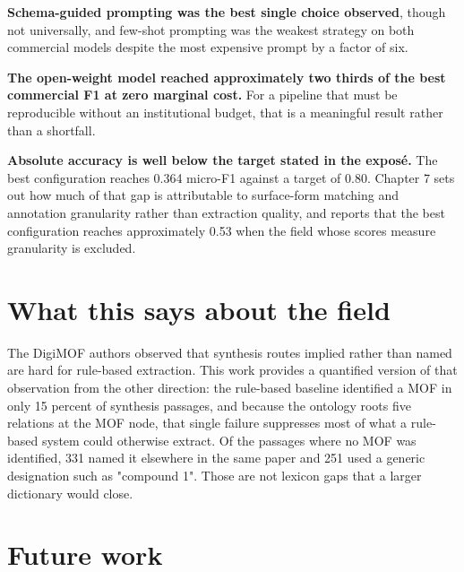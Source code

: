 \documentclass[11pt,a4paper,oneside]{report}
\begin{document}
\textbf{Schema-guided prompting was the best single choice observed}, though not universally, and few-shot prompting was the weakest strategy on both commercial models despite the most expensive prompt by a factor of six.

\textbf{The open-weight model reached approximately two thirds of the best commercial F1 at zero marginal cost.} For a pipeline that must be reproducible without an institutional budget, that is a meaningful result rather than a shortfall.

\textbf{Absolute accuracy is well below the target stated in the exposé.} The best configuration reaches 0.364 micro-F1 against a target of 0.80. Chapter 7 sets out how much of that gap is attributable to surface-form matching and annotation granularity rather than extraction quality, and reports that the best configuration reaches approximately 0.53 when the field whose scores measure granularity is excluded.

\section{What this says about the field}

The DigiMOF authors observed that synthesis routes implied rather than named are hard for rule-based extraction. This work provides a quantified version of that observation from the other direction: the rule-based baseline identified a MOF in only 15 percent of synthesis passages, and because the ontology roots five relations at the MOF node, that single failure suppresses most of what a rule-based system could otherwise extract. Of the passages where no MOF was identified, 331 named it elsewhere in the same paper and 251 used a generic designation such as "compound 1". Those are not lexicon gaps that a larger dictionary would close.

\section{Future work}
\end{document}
